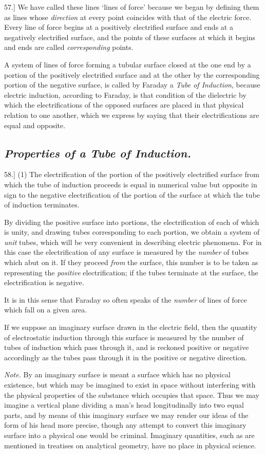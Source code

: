 \documentclass[12pt,oneside]{book}[2021/10/04]
\newcommand{\Heading}{\centering\normalfont}
\newcommand{\Subsection}[1]{\subsection*{\normalsize\Heading\itshape #1}}
\newcommand{\article}[1]{\phantomsection \label{art:#1}{#1.]}}
\newcommand{\¬}{\hphantom{0}}
\begin{document}
\article{57} We have called these lines `lines of force' because we
began by defining them as lines whose \textit{direction} at every point
coincides with that of the electric force. Every line of force
begins at a positively electrified surface and ends at a negatively
electrified surface, and the points of these surfaces at which it
begins and ends are called \textit{corresponding} points.

A system of lines of force forming a tubular surface closed at
the one end by a portion of the positively electrified surface and
at the other by the corresponding portion of the negative surface,
is called by Faraday a \textit{Tube of Induction}, because electric induction,
according to Faraday, is that condition of the dielectric by which
the electrifications of the opposed surfaces are placed in that
physical relation to one another, which we express by saying that
their electrifications are equal and opposite.

\Subsection{Properties of a Tube of Induction.}

\article{58} (1) The electrification of the portion of the positively
electrified surface from which the tube of induction proceeds is
equal in numerical value but opposite in sign to the negative
electrification of the portion of the surface at which the tube of
induction terminates.

By dividing the positive surface into portions, the electrification
of each of which is unity, and drawing tubes corresponding to
each portion, we obtain a system of \textit{unit} tubes, which will be very
convenient in describing electric phenomena. For in this case
the electrification of any surface is measured by the \textit{number} of
tubes which abut on it. If they proceed \textit{from} the surface, this
number is to be taken as representing the \textit{positive} electrification;
if the tubes terminate at the surface, the electrification is negative.

It is in this sense that Faraday so often speaks of the \textit{number} of
lines of force which fall on a given area.

If we suppose an imaginary surface drawn in the electric field,
then the quantity of electrostatic induction through this surface
is measured by the number of tubes of induction which pass
through it, and is reckoned positive or negative accordingly as
the tubes pass through it in the positive or negative direction.

\textit{Note.} By an imaginary surface is meant a surface which has
no physical existence, but which may be imagined to exist in
space without interfering with the physical properties of the substance
which occupies that space. Thus we may imagine a vertical
plane dividing a man's head longitudinally into two equal parts,
and by means of this imaginary surface we may render our ideas
of the form of his head more precise, though any attempt to convert
this imaginary surface into a physical one would be criminal.
Imaginary quantities, such as are mentioned in treatises on
analytical geometry, have no place in physical science.
\end{document}
